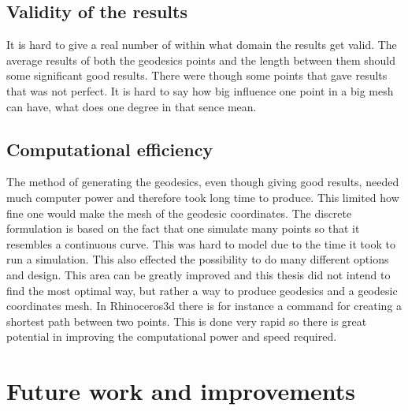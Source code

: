 \subsection{Validity of the results}
It is hard to give a real number of within what domain the results get valid. The average results of both the geodesics points and the length between them should some significant good results. There were though some points that gave results that was not perfect. It is hard to say how big influence one point in a big mesh can have, what does one degree in that sence mean.


\subsection{Computational efficiency}
The method of generating the geodesics, even though giving good results, needed much computer power and therefore took long time to produce. This limited how fine one would make the mesh of the geodesic coordinates. The discrete formulation is based on the fact that one simulate many points so that it resembles a continuous curve. This was hard to model due to the time it took to run a simulation. This also effected the possibility to do many different options and design. This area can be greatly improved and this thesis did not intend to find the most optimal way, but rather a way to produce geodesics and a geodesic coordinates mesh. In Rhinoceros3d there is for instance a command for creating a shortest path between two points. This is done very rapid so there is great potential in improving the computational power and speed required.     

\section{Future work and improvements}

